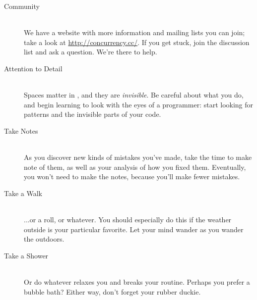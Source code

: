\begin{description}
	\item[Community]\ \\ We have a website with more information and mailing lists you can join; take a look at \url{http://concurrency.cc/}. If you get stuck, join the discussion list and ask a question. We're there to help.
	\item[Attention to Detail]\ \\ Spaces matter in \plumbing, and they are {\em invisible}. Be careful about what you do, and begin learning to look with the eyes of a programmer: start looking for patterns and the invisible parts of your code.
	\item[Take Notes]\ \\ As you discover new kinds of mistakes you've made, take the time to make note of them, as well as your analysis of how you fixed them. Eventually, you won't need to make the notes, because you'll make fewer mistakes.
	\item[Take a Walk]\ \\ ...or a roll, or whatever. You should especially do this if the weather outside is your particular favorite. Let your mind wander as you wander the outdoors.
	\item[Take a Shower]\ \\ Or do whatever relaxes you and breaks your routine. Perhaps you prefer a bubble bath? Either way, don't forget your rubber duckie.
\end{description}

\newpage

